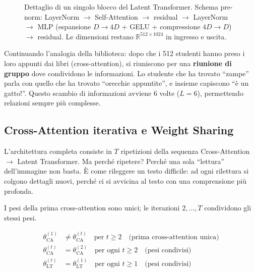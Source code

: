 \documentclass[12pt,a4paper]{article}
\begin{document}
\begin{figure}[H]
\caption{Dettaglio di un singolo blocco del Latent Transformer. Schema pre-norm: LayerNorm $\to$ Self-Attention $\to$ residual $\to$ LayerNorm $\to$ MLP (espansione $D \to 4D$ + GELU + compressione $4D \to D$) $\to$ residual. Le dimensioni restano $\mathbb{R}^{512 \times 1024}$ in ingresso e uscita.}
\label{fig:latent_transformer_block}
\end{figure}


\begin{notabox}
Continuando l'analogia della biblioteca: dopo che i 512 studenti hanno preso i loro appunti dai libri (cross-attention), si riuniscono per una \textbf{riunione di gruppo} dove condividono le informazioni. Lo studente che ha trovato ``zampe'' parla con quello che ha trovato ``orecchie appuntite'', e insieme capiscono ``\`e un gatto!''. Questo scambio di informazioni avviene 6 volte ($L=6$), permettendo relazioni sempre pi\`u complesse.
\end{notabox}

\subsection{Cross-Attention iterativa e Weight Sharing} \label{sec:iterative}

L'architettura completa consiste in $T$ ripetizioni della sequenza Cross-Attention $\to$ Latent Transformer. Ma perch\'e ripetere? Perch\'e una sola ``lettura'' dell'immagine non basta. \`E come rileggere un testo difficile: ad ogni rilettura si colgono dettagli nuovi, perch\'e ci si avvicina al testo con una comprensione pi\`u profonda.

I pesi della prima cross-attention sono unici; le iterazioni $2, \ldots, T$ condividono gli stessi pesi.

\begin{formulabox}
\begin{align}
    \theta_{\text{CA}}^{(1)} &\neq \theta_{\text{CA}}^{(t)} \quad \text{per } t \geq 2 \quad \text{(prima cross-attention unica)} \\
    \theta_{\text{CA}}^{(t)} &= \theta_{\text{CA}}^{(2)} \quad \text{per ogni } t \geq 2 \quad \text{(pesi condivisi)} \\
    \theta_{\text{LT}}^{(t)} &= \theta_{\text{LT}}^{(1)} \quad \text{per ogni } t \geq 1 \quad \text{(pesi condivisi)}
\end{align}
\end{formulabox}
\end{document}

